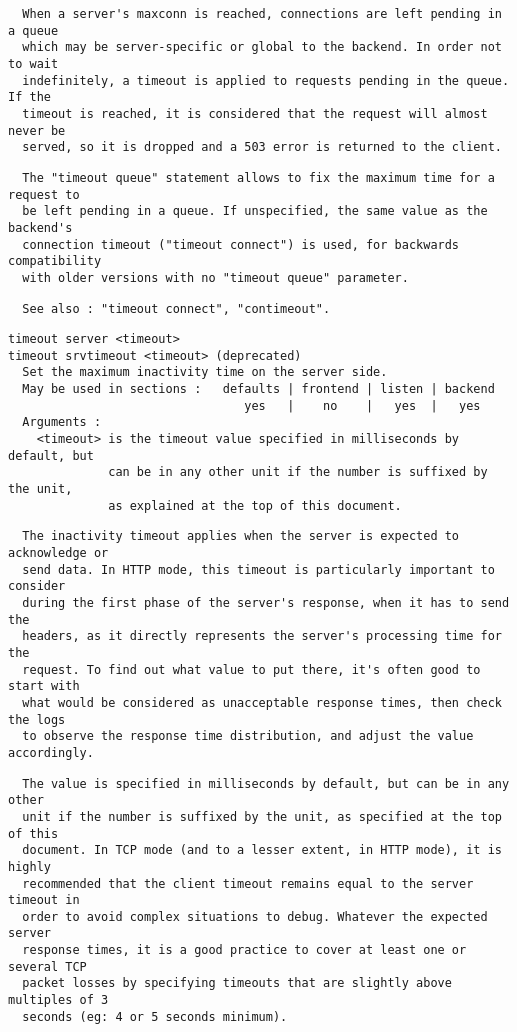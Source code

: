 \begin{verbatim}
  When a server's maxconn is reached, connections are left pending in a queue
  which may be server-specific or global to the backend. In order not to wait
  indefinitely, a timeout is applied to requests pending in the queue. If the
  timeout is reached, it is considered that the request will almost never be
  served, so it is dropped and a 503 error is returned to the client.
\end{verbatim}

\begin{verbatim}
  The "timeout queue" statement allows to fix the maximum time for a request to
  be left pending in a queue. If unspecified, the same value as the backend's
  connection timeout ("timeout connect") is used, for backwards compatibility
  with older versions with no "timeout queue" parameter.
\end{verbatim}

\begin{verbatim}
  See also : "timeout connect", "contimeout".
\end{verbatim}

\begin{verbatim}
timeout server <timeout>
timeout srvtimeout <timeout> (deprecated)
  Set the maximum inactivity time on the server side.
  May be used in sections :   defaults | frontend | listen | backend
                                 yes   |    no    |   yes  |   yes
  Arguments :
    <timeout> is the timeout value specified in milliseconds by default, but
              can be in any other unit if the number is suffixed by the unit,
              as explained at the top of this document.
\end{verbatim}

\begin{verbatim}
  The inactivity timeout applies when the server is expected to acknowledge or
  send data. In HTTP mode, this timeout is particularly important to consider
  during the first phase of the server's response, when it has to send the
  headers, as it directly represents the server's processing time for the
  request. To find out what value to put there, it's often good to start with
  what would be considered as unacceptable response times, then check the logs
  to observe the response time distribution, and adjust the value accordingly.
\end{verbatim}

\begin{verbatim}
  The value is specified in milliseconds by default, but can be in any other
  unit if the number is suffixed by the unit, as specified at the top of this
  document. In TCP mode (and to a lesser extent, in HTTP mode), it is highly
  recommended that the client timeout remains equal to the server timeout in
  order to avoid complex situations to debug. Whatever the expected server
  response times, it is a good practice to cover at least one or several TCP
  packet losses by specifying timeouts that are slightly above multiples of 3
  seconds (eg: 4 or 5 seconds minimum).
\end{verbatim}


